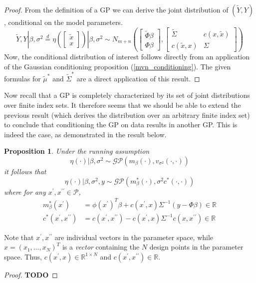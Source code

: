\documentclass[12pt]{article}
\newcommand{\R}{\mathcal{R}}
\def\R{\mathbb{R}}
\newtheorem{prop}{Proposition}
\begin{document}
\begin{proof}
From the definition of a GP we can derive the joint distribution of $(\tilde{Y}, Y)$, conditional on the model parameters. 
\[\tilde{Y}, Y|\beta, \sigma^2 \overset{d}{=} \eta\left(\begin{bmatrix} \tilde{x} \\ x \end{bmatrix}\right)|\beta, \sigma^2 \sim 
N_{m + n}\left(\begin{bmatrix} \tilde{\Phi}\beta \\ \Phi \beta \end{bmatrix}, \begin{bmatrix} \tilde{\Sigma} & c(x, \tilde{x}) \\ c(\tilde{x}, x) & \Sigma \end{bmatrix} \right)\]
Now, the conditional distribution of interest follows directly from an application of the Gaussian conditioning proposition (\ref{mvn_conditioning}). The given formulas
for $\tilde{\mu}^*$ and $\tilde{\Sigma}^*$ are a direct application of this result. 
\end{proof}

Now recall that a GP is completely characterized by its set of joint distributions over finite index sets. It therefore seems that we should be able to extend the previous 
result (which derives the distribution over an arbitrary finite index set) to conclude that conditioning the GP on data results in another GP. This is indeed the case, as 
demonstrated in the result below. 
\begin{prop}
Under the running assumption 
\[\eta(\cdot)|\beta, \sigma^2 \sim \mathcal{GP}(m_\beta (\cdot), v_{\sigma^2}(\cdot, \cdot)) \]
it follows that 
\[\eta(\cdot)|\beta, \sigma^2, y \sim \mathcal{GP}\left(m^*_\beta(\cdot), \sigma^2 c^*(\cdot, \cdot )\right)\] 
where for any $x^\prime, x^{\prime \prime} \in \mathcal{P}$, 
\begin{align*}
m^*_\beta(x^\prime) &= \phi(x^\prime)^T \beta + c(x^\prime, x) \Sigma^{-1} (y - \Phi \beta) \in \R \\ 
c^*(x^\prime, x^{\prime \prime}) &= c(x^\prime, x^{\prime \prime}) - c(x^\prime, x) \Sigma^{-1} c(x, x^{\prime \prime}) \in \R
\end{align*}
\end{prop}
Note that $x^\prime, x^{\prime \prime}$ are individual vectors in the parameter space, while $x = (x_1, \dots, x_N)^T$ is a \textit{vector} containing the $N$ design 
points in the parameter space. Thus, $c(x^\prime, x) \in \R^{1 \times N}$ and $c(x^\prime, x^{\prime \prime}) \in \R$. 
\begin{proof}
\textbf{TODO}
\end{proof}
\end{document}
